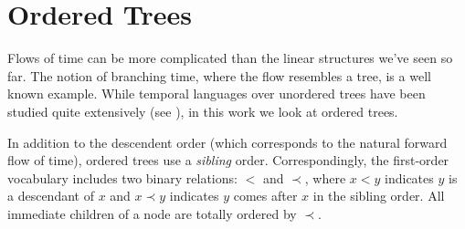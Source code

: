 \documentclass[a4paper,UKenglish,cleveref, autoref, thm-restate, numberwithinsect]{lipics-v2021}
\begin{document}
\section{Ordered Trees}
\label{sec:ordered-trees}


Flows of time can be more complicated than the linear structures we've seen so far. The notion of branching time, where the flow resembles a tree, is a well known example. While temporal languages over unordered trees have been studied quite extensively (see \cite{RabinovichUnordered00}), in this work we look at ordered trees.

In addition to the descendent order (which corresponds to the natural forward flow of time), ordered trees use a \textit{sibling} order. Correspondingly, the first-order vocabulary includes two binary relations: $<$ and $\prec$, where $x < y$ indicates $y$ is a descendant of $x$ and $x \prec y$ indicates $y$ comes after $x$ in the sibling order. All immediate children of a node are totally ordered by $\prec$. %
\end{document}
